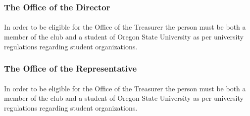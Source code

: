 \documentclass[12pt]{article}
\begin{document}
\subsubsection{The Office of the Director}
\paragraph{}
In order to be eligible for the Office of the Treasurer the person must be both a member of the club and a student of Oregon State University as per university regulations regarding student organizations.

\subsubsection{The Office of the Representative}
\paragraph{}
In order to be eligible for the Office of the Treasurer the person must be both a member of the club and a student of Oregon State University as per university regulations regarding student organizations.
\end{document}
